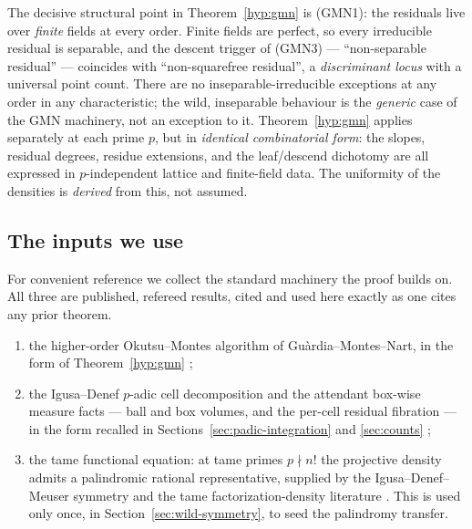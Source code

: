 \documentclass[pdflatex,sn-mathphys-num]{sn-jnl}%
\theoremstyle{plain}
\theoremstyle{definition}
\theoremstyle{remark}
\numberwithin{equation}{section}
\begin{document}
The decisive structural point in Theorem~\ref{hyp:gmn} is (GMN1): the residuals
live over \emph{finite} fields at every order. Finite fields are perfect, so every
irreducible residual is separable, and the descent trigger of (GMN3) ---
``non-separable residual'' --- coincides with ``non-squarefree residual'', a
\emph{discriminant locus} with a universal point count. There are no
inseparable-irreducible exceptions at any order in any characteristic; the wild,
inseparable behaviour is the \emph{generic} case of the GMN machinery, not an
exception to it. Theorem~\ref{hyp:gmn} applies separately at each prime $p$, but in
\emph{identical combinatorial form}: the slopes, residual degrees, residue
extensions, and the leaf/descend dichotomy are all expressed in $p$-independent
lattice and finite-field data. The uniformity of the densities is \emph{derived}
from this, not assumed.

\subsection{The inputs we use}\label{sec:standing}

For convenient reference we collect the standard machinery the proof builds on. All
three are published, refereed results, cited and used here exactly as one cites any
prior theorem.

\begin{enumerate}[label=\textup{(\roman*)},leftmargin=2.4em]
\item the higher-order Okutsu--Montes algorithm of Gu\`ardia--Montes--Nart, in the
form of Theorem~\ref{hyp:gmn} \cite{gmn2012};
\item the Igusa--Denef $p$-adic cell decomposition and the attendant box-wise
measure facts --- ball and box volumes, and the per-cell residual fibration ---
in the form recalled in Sections~\ref{sec:padic-integration} and \ref{sec:counts}
\cite{denef1991functional,igusa2000introduction};
\item the tame functional equation: at tame primes $p\nmid n!$ the projective
density admits a palindromic rational representative, supplied by the
Igusa--Denef--Meuser symmetry and the tame factorization-density literature
\cite{denef1991functional,del_corso_dvornicich_2000,john,caruso2022zeroes}. This is
used only once, in Section~\ref{sec:wild-symmetry}, to seed the palindromy transfer.
\end{enumerate}

\end{document}
